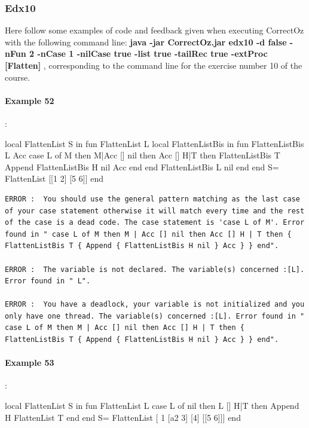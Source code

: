 \documentclass[11pt,a4paper,twoside,openright]{report}
\begin{document}
\subsubsection{Edx10}
Here follow some examples of code and feedback given when executing 
CorrectOz with the following command line: \textbf{java -jar CorrectOz.jar edx10 -d 
false -nFun 2 -nCase 1 -nilCase true -list true -tailRec true -extProc [Flatten] }, 
corresponding to the command line for the exercise number 10 of the course.

\paragraph{Example 52}:

\begin{OZ}
local FlattenList S in
	fun {FlattenList L}
		local FlattenListBis in
			fun {FlattenListBis L Acc}
					case L of M then M|Acc
					[] nil then Acc
					[] H|T then {FlattenListBis T {Append 
{FlattenListBis H nil} Acc}}
					end
			end
				{FlattenListBis L nil}
		end
	end
	S= {FlattenList [[1 2] [5 6]]}
end
\end{OZ}

\begin{lstlisting}
ERROR :  You should use the general pattern matching as the last case of your case statement otherwise it will match every time and the rest of the case is a dead code. The case statement is 'case L of M'. Error found in " case L of M then M | Acc [] nil then Acc [] H | T then { FlattenListBis T { Append { FlattenListBis H nil } Acc } } end".

ERROR :  The variable is not declared. The variable(s) concerned :[L]. Error found in " L".

ERROR :  You have a deadlock, your variable is not initialized and you only have one thread. The variable(s) concerned :[L]. Error found in " case L of M then M | Acc [] nil then Acc [] H | T then { FlattenListBis T { Append { FlattenListBis H nil } Acc } } end".
\end{lstlisting}


\paragraph{Example 53}:

\begin{OZ}
local FlattenList S in
	fun {FlattenList L}
		case L of nil then L
			[] H|T then {Append H {FlattenList T}}
		end
	end
	S= {FlattenList [ 1 [a2 3] [4] [[5 6]]]}
end
\end{OZ}
\end{document}
